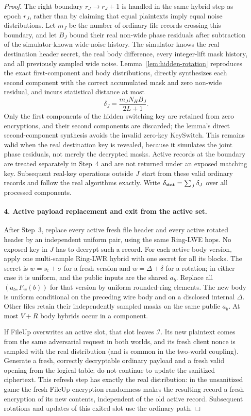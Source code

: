 \begin{proof}
The right boundary $r_J\to r_J+1$ is handled in the same hybrid step as epoch $r_J$, rather than by claiming that equal plaintexts imply equal noise distributions. Let $m_J$ be the number of ordinary file records crossing this boundary, and let $B_J$ bound their real non-wide phase residuals after subtraction of the simulator-known wide-noise history. The simulator knows the real destination header secret, the real body difference, every integer-lift mask history, and all previously sampled wide noise. Lemma~\ref{lem:hidden-rotation} reproduces the exact first-component and body distributions, directly synthesizes each second component with the correct accumulated mask and zero non-wide residual, and incurs statistical distance at most
\[
 \delta_J=\frac{m_JN_HB_J}{2L+1}.
\]
Only the first components of the hidden switching key are retained from zero encryptions, and their second components are discarded; the lemma's direct second-component synthesis avoids the invalid zero-key KeySwitch. This remains valid when the real destination key is revealed, because it simulates the joint phase residuals, not merely the decrypted masks. Active records at the boundary are treated separately in Step~4 and are not returned under an exposed matching key. Subsequent real-key operations outside $J$ start from these valid ordinary records and follow the real algorithms exactly. Write $\delta_{\rm stat}=\sum_J\delta_J$ over all processed components.

\paragraph{4. Active payload replacement and exit from the active set.}
After Step~3, replace every active fresh file header and every active rotated header by an independent uniform pair, using the same Ring-LWE hops. No exposed key in $J$ has to decrypt such a record. For each active body version, apply one multi-sample Ring-LWR hybrid with one secret for all its blocks. The secret is $w=s_t+\sigma$ for a fresh version and $w=\Delta+\delta$ for a rotation; in either case it is uniform, and the public inputs are the shared $a_b$. Replace all $(a_b,F_w(b))$ for that version by uniform rounded-ring elements. The new body is uniform conditional on the preceding wire body and on a disclosed internal $\Delta$. Other files retain their independently sampled masks on the same public $a_b$. At most $V+R$ body hybrids occur in a component.

If FileUp overwrites an active slot, that slot leaves $\mathcal I$. Its new plaintext comes from the same adversarial request in both worlds, and its fresh client nonce is sampled with the real distribution (and is common in the two-world coupling). Generate a fresh, correctly decryptable ordinary payload and a fresh valid opening from the logical table; do not continue to update the sanitized ciphertext. This refresh step has exactly the real distribution: in the unsanitized game the fresh FileUp encryption randomness makes the resulting record a fresh encryption of its new contents, independent of the old active record. Subsequent rotations and updates of this exited slot use the ordinary path.


\end{proof}
